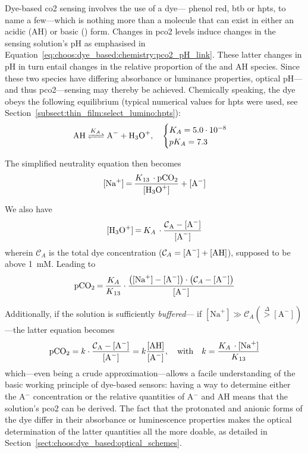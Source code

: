 Dye-based \gls{co2} sensing involves the use of a dye---\eg{} phenol red, \gls{btb} or \gls{hpts}, to name a few\cite{vurek1983, uttamlal1995, degrandpre1999, lu2008}---which is nothing more than a molecule that can exist in either an acidic (AH) or basic () form. Changes in \gls{pco2} levels induce changes in the sensing solution's pH as emphasised in Equation~\ref{eq:choos:dye_based:chemistry:pco2_pH_link}. These latter changes in pH in turn entail changes in the relative proportion of the  and AH species. Since these two species have differing absorbance or luminance properties, optical pH---and thus \gls{pco2}---sensing may thereby be achieved. Chemically speaking, the dye obeys the following equilibrium (typical numerical values for \gls{hpts} were used, see Section~\ref{subsect:thin_film:select_lumino:hpts}):
\begin{equation}\label{eq:choos:dye_based:chemistry:wet_dye}
	\ce{AH <=>[$K_A$] A^- + H_3O^+},\quad \begin{cases}
		K_A = 5.0\cdot 10^{-8} \\ pK_A = 7.3
	\end{cases}
\end{equation}

The simplified neutrality equation then becomes
\begin{equation}
	\ce{[Na^+] = \frac{$K$_{13} \cdot pCO_2}{[H_3O^+]} + [A^-] }
\end{equation}

We also have
\begin{equation}
	\ce{[H_3O^+] = $K_A$ \cdot \frac{\mathcal{C}_A - [A^-]}{[A^-]}}
\end{equation}
wherein $\mathcal{C}_A$ is the total dye concentration ($\mathcal{C}_A = \ce{[A^-] + [AH]}$), supposed to be above 1~mM. Leading to
\begin{equation}\label{eq:choos:dye_based:chemistry:wet_aah_full}
	\ce{pCO_2 = \frac{$K_A$}{$K$_{13}}}\cdot \frac{\left([\text{Na}^+] - \ce{[A^-]}\right)\cdot\left(\mathcal{C}_A - \ce{[A^-]}\right)}{\ce{[A^-]}}
\end{equation}

Additionally, if the solution is sufficiently \emph{buffered}---\ie{} if $[\text{Na}^+] \gg \mathcal{C}_A (\overset{\Delta}{>} [\text{A}^-])$---the latter equation becomes
\begin{equation}\label{eq:choos:dye_based:chemistry:wet_aah_buff}
	\ce{pCO_2} = k \cdot \ce{\frac{\mathcal{C}_A - [A^-]}{[A^-]}} = k \ce{\frac{[AH]}{[A^-]}}, \quad \text{with} \quad k = \ce{\frac{$K_A$ \cdot [Na^+]}{$K$_{13}}}
\end{equation}
which---even being a crude approximation---allows a facile understanding of the basic working principle of dye-based sensors: having a way to determine either the A$^-$ concentration or the relative quantities of A$^-$ and AH means that the solution's \gls{pco2} can be derived. The fact that the protonated and anionic forms of the dye differ in their absorbance or luminescence properties makes the optical determination of the latter quantities all the more doable, as detailed in Section~\ref{sect:choos:dye_based:optical_schemes}.


